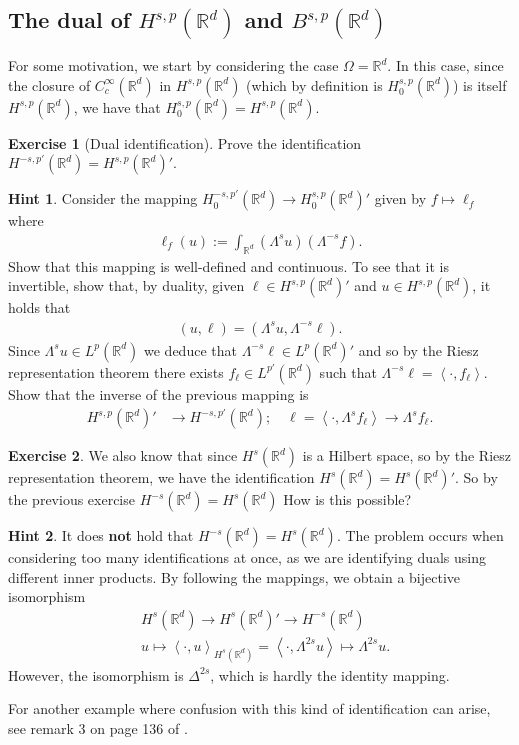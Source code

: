 \documentclass[
    a4paper,
    DIV=14,
    abstract=true,
    numbers=noenddot
]
{scrartcl}
\theoremstyle{definition}
\newtheorem{exercise}{Exercise}
\newtheorem*{hint}{Hint}
\newcommand{\br}[1]{\left\langle#1\right\rangle}
\newcommand{\R}{\mathbb{R}}
\begin{document}
\subsection{The dual of $H^{s,p}(\R^d)$ and $B^{s,p}(\R^d)$}
For some motivation, we start by considering the case $\Omega =\R^d$. In this case, since the closure of
$C_c^\infty(\R^d)$ in $H^{s,p}(\R^d)$ (which by definition is $H_0^{s,p}(\R^d)$) is itself $H^{s,p}(\R^d)$, we have that $H_0^{s,p}(\R^d)=H^{s,p}(\R^d)$.
\begin{exercise}[Dual identification]\label{dual exercise}
  Prove the identification $H^{-s,p'}(\R^d)=H^{s,p}(\R^d)'$.
\end{exercise}
\begin{hint}

  Consider the mapping  $H_0^{-s,p'}(\R^d) \to H^{s,p}_0(\R^d)'$ given by $f \mapsto \ell_f$ where
  \begin{align*}
    \ell_f(u):= \int_{\R^d}(\Lambda^s u)(\Lambda ^{-s}f).
  \end{align*}
  Show that this mapping is well-defined and continuous. To see that it is invertible, show that, by duality, given $\ell \in H^{s,p}(\R^d)'$ and $u \in H^{s,p}(\R^d)$, it holds that
  \begin{align*}
    (u,\ell )=(\Lambda ^s u,\Lambda ^{-s}\ell ).
  \end{align*}
  Since $ \Lambda ^s u \in L^p(\R^d)$ we deduce that $\Lambda ^{-s}\ell \in L^{p}(\R^d)'$ and so by the Riesz representation theorem there exists $f_\ell \in L^{p'}(\R^d)$ such that $\Lambda ^{-s}\ell =\br{\cdot,f_\ell}$. Show that the inverse of the previous mapping is
  \begin{align*}
    H^{s,p}(\R^d)'                & \longrightarrow H^{-s,p'}(\R^d); \quad \ell = \br{\cdot, \Lambda^s  f_\ell} \to \Lambda^s  f_\ell.\end{align*}
\end{hint}
\begin{exercise}
  We also know that since $H^{s}(\R^d)$ is a Hilbert space, so by the Riesz representation theorem, we have the identification $H^s(\R^d) = H^{s}(\R^d)'$. So by the previous exercise $H^{-s}(\R^d)= H^s(\R^d)$ How is this possible?
\end{exercise}
\begin{hint}
  It does \textbf{not} hold that $H^{-s}(\R^d)= H^s(\R^d)$. The problem occurs when considering too many identifications at once, as we are identifying duals using different inner products. By following the mappings, we obtain a bijective isomorphism
  \begin{align*}
     & H^{s}(\R^d) \to  H^s(\R^d)' \to H^{-s}(\R^d)                                                    \\
     & u \longmapsto   \br{\cdot, u}_{H^s(\R^d)}= \br{\cdot, \Lambda^{2s} u } \mapsto \Lambda ^{2s} u.
  \end{align*}
  However, the isomorphism is $\Delta ^{2s}$, which is hardly the identity mapping.
\end{hint}
For another example where confusion with this kind of identification can arise, see remark 3 on page  136 of \cite{brezis2011functional}.
\end{document}
